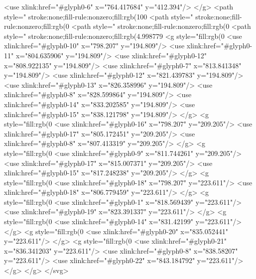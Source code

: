   <use xlink:href="#glyph0-6" x="764.417684" y="412.394"/>
</g>
<path style=" stroke:none;fill-rule:nonzero;fill:rgb(100%
<path style=" stroke:none;fill-rule:nonzero;fill:rgb(0%
<path style=" stroke:none;fill-rule:nonzero;fill:rgb(0%
<path style=" stroke:none;fill-rule:nonzero;fill:rgb(4.998779%
<g style="fill:rgb(0%
  <use xlink:href="#glyph0-10" x="798.207" y="194.809"/>
  <use xlink:href="#glyph0-11" x="804.635906" y="194.809"/>
  <use xlink:href="#glyph0-12" x="808.922135" y="194.809"/>
  <use xlink:href="#glyph0-7" x="813.841348" y="194.809"/>
  <use xlink:href="#glyph0-12" x="821.439783" y="194.809"/>
  <use xlink:href="#glyph0-13" x="826.358996" y="194.809"/>
  <use xlink:href="#glyph0-8" x="828.599864" y="194.809"/>
  <use xlink:href="#glyph0-14" x="833.202585" y="194.809"/>
  <use xlink:href="#glyph0-15" x="838.121798" y="194.809"/>
</g>
<g style="fill:rgb(0%
  <use xlink:href="#glyph0-16" x="798.207" y="209.205"/>
  <use xlink:href="#glyph0-17" x="805.172451" y="209.205"/>
  <use xlink:href="#glyph0-8" x="807.413319" y="209.205"/>
</g>
<g style="fill:rgb(0%
  <use xlink:href="#glyph0-9" x="811.744261" y="209.205"/>
  <use xlink:href="#glyph0-17" x="815.007371" y="209.205"/>
  <use xlink:href="#glyph0-15" x="817.248238" y="209.205"/>
</g>
<g style="fill:rgb(0%
  <use xlink:href="#glyph0-18" x="798.207" y="223.611"/>
  <use xlink:href="#glyph0-18" x="806.779459" y="223.611"/>
</g>
<g style="fill:rgb(0%
  <use xlink:href="#glyph0-1" x="818.569439" y="223.611"/>
  <use xlink:href="#glyph0-19" x="823.391337" y="223.611"/>
</g>
<g style="fill:rgb(0%
  <use xlink:href="#glyph0-14" x="831.42199" y="223.611"/>
</g>
<g style="fill:rgb(0%
  <use xlink:href="#glyph0-20" x="835.052441" y="223.611"/>
</g>
<g style="fill:rgb(0%
  <use xlink:href="#glyph0-21" x="836.341203" y="223.611"/>
  <use xlink:href="#glyph0-8" x="838.58207" y="223.611"/>
  <use xlink:href="#glyph0-22" x="843.184792" y="223.611"/>
</g>
</g>
</svg>
